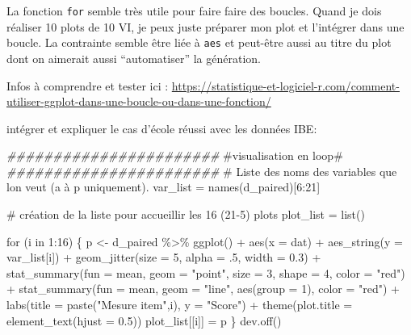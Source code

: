 \documentclass[
  letterpaper,
  DIV=11,
  numbers=noendperiod]{scrreprt}
\newenvironment{Shaded}{\begin{snugshade}}{\end{snugshade}}
\newcommand{\AttributeTok}[1]{\textcolor[rgb]{0.40,0.45,0.13}{#1}}
\newcommand{\CommentTok}[1]{\textcolor[rgb]{0.37,0.37,0.37}{#1}}
\newcommand{\ControlFlowTok}[1]{\textcolor[rgb]{0.00,0.23,0.31}{#1}}
\newcommand{\DecValTok}[1]{\textcolor[rgb]{0.68,0.00,0.00}{#1}}
\newcommand{\DocumentationTok}[1]{\textcolor[rgb]{0.37,0.37,0.37}{\textit{#1}}}
\newcommand{\FloatTok}[1]{\textcolor[rgb]{0.68,0.00,0.00}{#1}}
\newcommand{\FunctionTok}[1]{\textcolor[rgb]{0.28,0.35,0.67}{#1}}
\newcommand{\NormalTok}[1]{\textcolor[rgb]{0.00,0.23,0.31}{#1}}
\newcommand{\OtherTok}[1]{\textcolor[rgb]{0.00,0.23,0.31}{#1}}
\newcommand{\SpecialCharTok}[1]{\textcolor[rgb]{0.37,0.37,0.37}{#1}}
\newcommand{\StringTok}[1]{\textcolor[rgb]{0.13,0.47,0.30}{#1}}
\begin{document}
La fonction \texttt{for} semble très utile pour faire faire des boucles.
Quand je dois réaliser 10 plots de 10 VI, je peux juste préparer mon
plot et l'intégrer dans une boucle. La contrainte semble être liée à
\texttt{aes} et peut-être aussi au titre du plot dont on aimerait aussi
``automatiser'' la génération.

Infos à comprendre et tester ici :
\url{https://statistique-et-logiciel-r.com/comment-utiliser-ggplot-dans-une-boucle-ou-dans-une-fonction/}

intégrer et expliquer le cas d'école réussi avec les données IBE:

\begin{Shaded}
\begin{Highlighting}[]
\DocumentationTok{\#\#\#\#\#\#\#\#\#\#\#\#\#\#\#\#\#\#\#\#\#\#\#}
\CommentTok{\#visualisation en loop\#}
\DocumentationTok{\#\#\#\#\#\#\#\#\#\#\#\#\#\#\#\#\#\#\#\#\#\#\#}
\CommentTok{\# Liste des noms des variables que l\textquotesingle{}on veut (a à p uniquement).}
\NormalTok{var\_list }\OtherTok{=} \FunctionTok{names}\NormalTok{(d\_paired)[}\DecValTok{6}\SpecialCharTok{:}\DecValTok{21}\NormalTok{]}

\CommentTok{\# création de la liste pour accueillir les 16 (21{-}5) plots}
\NormalTok{plot\_list }\OtherTok{=} \FunctionTok{list}\NormalTok{()}

\ControlFlowTok{for}\NormalTok{ (i }\ControlFlowTok{in} \DecValTok{1}\SpecialCharTok{:}\DecValTok{16}\NormalTok{) \{}
\NormalTok{  p }\OtherTok{\textless{}{-}}\NormalTok{ d\_paired }\SpecialCharTok{\%\textgreater{}\%} 
    \FunctionTok{ggplot}\NormalTok{() }\SpecialCharTok{+}
    \FunctionTok{aes}\NormalTok{(}\AttributeTok{x =}\NormalTok{ dat) }\SpecialCharTok{+}
    \FunctionTok{aes\_string}\NormalTok{(}\AttributeTok{y =}\NormalTok{ var\_list[i]) }\SpecialCharTok{+}
    \FunctionTok{geom\_jitter}\NormalTok{(}\AttributeTok{size =} \DecValTok{5}\NormalTok{, }\AttributeTok{alpha =}\NormalTok{ .}\DecValTok{5}\NormalTok{, }\AttributeTok{width =} \FloatTok{0.3}\NormalTok{) }\SpecialCharTok{+}
    \FunctionTok{stat\_summary}\NormalTok{(}\AttributeTok{fun =}\NormalTok{ mean, }\AttributeTok{geom =} \StringTok{"point"}\NormalTok{, }\AttributeTok{size =} \DecValTok{3}\NormalTok{, }\AttributeTok{shape =} \DecValTok{4}\NormalTok{, }\AttributeTok{color =} \StringTok{"red"}\NormalTok{) }\SpecialCharTok{+}
    \FunctionTok{stat\_summary}\NormalTok{(}\AttributeTok{fun =}\NormalTok{ mean, }\AttributeTok{geom =} \StringTok{"line"}\NormalTok{, }\FunctionTok{aes}\NormalTok{(}\AttributeTok{group =} \DecValTok{1}\NormalTok{), }\AttributeTok{color =} \StringTok{"red"}\NormalTok{) }\SpecialCharTok{+}
    \FunctionTok{labs}\NormalTok{(}\AttributeTok{title =} \FunctionTok{paste}\NormalTok{(}\StringTok{"Mesure item"}\NormalTok{,i), }\AttributeTok{y =} \StringTok{"Score"}\NormalTok{) }\SpecialCharTok{+}
    \FunctionTok{theme}\NormalTok{(}\AttributeTok{plot.title =} \FunctionTok{element\_text}\NormalTok{(}\AttributeTok{hjust =} \FloatTok{0.5}\NormalTok{))  }
\NormalTok{  plot\_list[[i]] }\OtherTok{=}\NormalTok{ p}
\NormalTok{\}}
\FunctionTok{dev.off}\NormalTok{()}


\end{Highlighting}
\end{Shaded}
\end{document}
